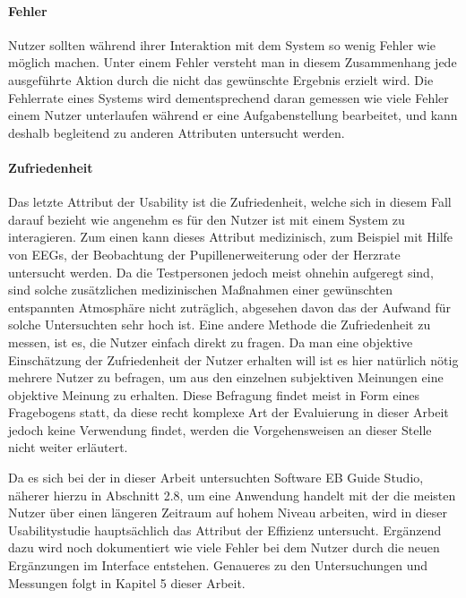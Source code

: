 \paragraph{Fehler}
Nutzer sollten während ihrer Interaktion mit dem System so wenig Fehler wie möglich machen. 
Unter einem Fehler versteht man in diesem Zusammenhang jede ausgeführte Aktion durch die nicht das gewünschte Ergebnis erzielt wird.
Die Fehlerrate eines Systems wird dementsprechend daran gemessen wie viele Fehler einem Nutzer unterlaufen während er eine Aufgabenstellung bearbeitet, und kann deshalb begleitend zu anderen Attributen untersucht werden\cite{Nielsen.1995?}.

\paragraph{Zufriedenheit}
Das letzte Attribut der Usability ist die Zufriedenheit, welche sich in diesem Fall darauf bezieht wie angenehm es für den Nutzer ist mit einem System zu interagieren.
Zum einen kann dieses Attribut medizinisch, zum Beispiel mit Hilfe von EEGs, der Beobachtung der Pupillenerweiterung oder der Herzrate untersucht werden.
Da die Testpersonen jedoch meist ohnehin aufgeregt sind, sind solche zusätzlichen medizinischen Maßnahmen einer gewünschten entspannten Atmosphäre nicht zuträglich, abgesehen davon das der Aufwand für solche Untersuchten sehr hoch ist.
Eine andere Methode die Zufriedenheit zu messen, ist es, die Nutzer einfach direkt zu fragen.
Da man eine objektive Einschätzung der Zufriedenheit der Nutzer erhalten will ist es hier natürlich nötig mehrere Nutzer zu befragen, um aus den einzelnen subjektiven Meinungen eine objektive Meinung zu erhalten\cite{Nielsen.1995?}.
Diese Befragung findet meist in Form eines Fragebogens statt, da diese recht komplexe Art der Evaluierung in dieser Arbeit jedoch keine Verwendung findet, werden die Vorgehensweisen an dieser Stelle nicht weiter erläutert.

Da es sich bei der in dieser Arbeit untersuchten Software EB Guide Studio, näherer hierzu in Abschnitt 2.8, um eine Anwendung handelt mit der die meisten Nutzer über einen längeren Zeitraum auf hohem Niveau arbeiten, wird in dieser Usabilitystudie hauptsächlich das Attribut der Effizienz untersucht. Ergänzend dazu wird noch dokumentiert wie viele Fehler bei dem Nutzer durch die neuen Ergänzungen im Interface entstehen. Genaueres zu den Untersuchungen und Messungen folgt in Kapitel 5 dieser Arbeit.

